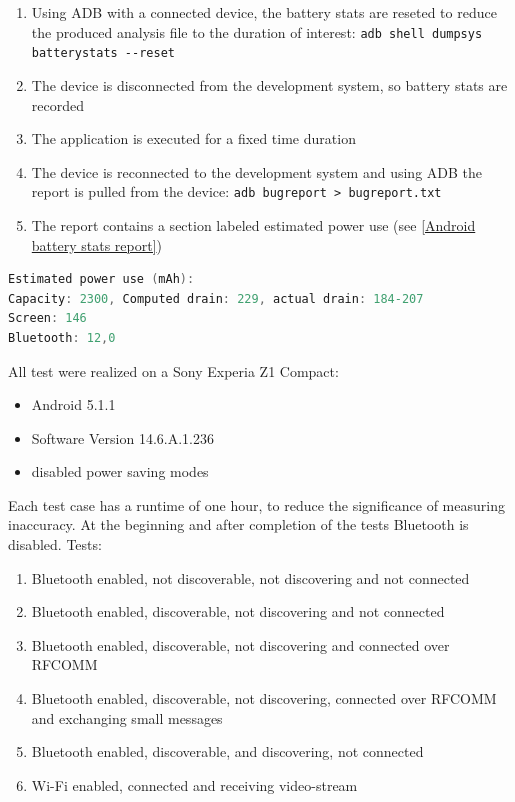\begin{enumerate}
	\item Using \gls{ADB} with a connected device, the battery stats are reseted to reduce the produced analysis file to the duration of interest: \lstinline|adb shell dumpsys batterystats --reset|
	\item The device is disconnected from the development system, so battery stats are recorded
	\item The application is executed for a fixed time duration
	\item The device is reconnected to the development system and using \gls{ADB} the report is pulled from the device: \lstinline|adb bugreport > bugreport.txt|
	\item The report contains a section labeled estimated power use (see \autoref{Android battery stats report})
\end{enumerate}
  
\begin{lstlisting}[language=C, caption={Android battery stats report}, label={Android battery stats report}]
Estimated power use (mAh):
Capacity: 2300, Computed drain: 229, actual drain: 184-207
Screen: 146
Bluetooth: 12,0
\end{lstlisting}
  
All test were realized on a Sony Experia Z1 Compact:
\begin{itemize}
	\item Android 5.1.1
	\item Software Version 14.6.A.1.236
	\item disabled power saving modes
\end{itemize}   

Each test case has a runtime of one hour, to reduce the significance of measuring inaccuracy. At the beginning and after completion of the tests Bluetooth is disabled. Tests:

\begin{enumerate}
	\item Bluetooth enabled, not discoverable, not discovering and not connected
	\item Bluetooth enabled, discoverable, not discovering and not connected
	\item Bluetooth enabled, discoverable, not discovering and connected over \gls{RFCOMM}
	\item Bluetooth enabled, discoverable, not discovering, connected over \gls{RFCOMM} and exchanging small messages
	\item Bluetooth enabled, discoverable, and discovering, not connected
	\item Wi-Fi enabled, connected and receiving video-stream
\end{enumerate}

